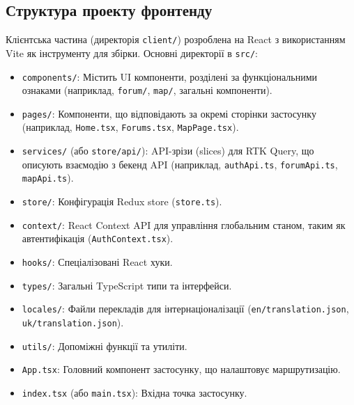 \subsection{Структура проекту фронтенду}
Клієнтська частина (директорія \texttt{client/}) розроблена на React з використанням Vite як інструменту для збірки. Основні директорії в \texttt{src/}:
\begin{itemize}
    \item \texttt{components/}: Містить UI компоненти, розділені за функціональними ознаками (наприклад, \texttt{forum/}, \texttt{map/}, загальні компоненти).
    \item \texttt{pages/}: Компоненти, що відповідають за окремі сторінки застосунку (наприклад, \texttt{Home.tsx}, \texttt{Forums.tsx}, \texttt{MapPage.tsx}).
    \item \texttt{services/} (або \texttt{store/api/}): API-зрізи (slices) для RTK Query, що описують взаємодію з бекенд API (наприклад, \texttt{authApi.ts}, \texttt{forumApi.ts}, \texttt{mapApi.ts}).
    \item \texttt{store/}: Конфігурація Redux store (\texttt{store.ts}).
    \item \texttt{context/}: React Context API для управління глобальним станом, таким як автентифікація (\texttt{AuthContext.tsx}).
    \item \texttt{hooks/}: Спеціалізовані React хуки.
    \item \texttt{types/}: Загальні TypeScript типи та інтерфейси.
    \item \texttt{locales/}: Файли перекладів для інтернаціоналізації (\texttt{en/translation.json}, \texttt{uk/translation.json}).
    \item \texttt{utils/}: Допоміжні функції та утиліти.
    \item \texttt{App.tsx}: Головний компонент застосунку, що налаштовує маршрутизацію.
    \item \texttt{index.tsx} (або \texttt{main.tsx}): Вхідна точка застосунку.
\end{itemize}

